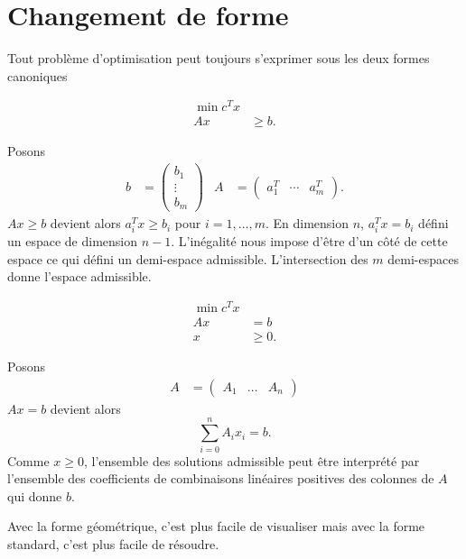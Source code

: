 \section{Changement de forme}
Tout problème d'optimisation peut toujours s'exprimer sous les deux
formes canoniques
\begin{mydef}
  \begin{align*}
    \min c^Tx\\
    Ax & \geq b.
  \end{align*}
\end{mydef}
Posons
\begin{align*}
  b & = \begin{pmatrix}b_1\\\vdots\\b_m\end{pmatrix} &
  A & = \begin{pmatrix}a_1^T & \cdots & a_m^T\end{pmatrix}.
\end{align*}
$Ax \geq b$ devient alors $a_i^Tx \geq b_i$ pour $i = 1, \ldots, m$.
En dimension $n$, $a_i^Tx = b_i$ défini un espace de dimension $n-1$.
L'inégalité nous impose d'être d'un côté de cette espace ce qui défini
un demi-espace admissible.
L'intersection des $m$ demi-espaces donne l'espace admissible.
\begin{mydef}
  \begin{align*}
    \min c^Tx\\
    Ax & = b\\
    x & \geq 0.
  \end{align*}
\end{mydef}
Posons
\begin{align*}
A & = \begin{pmatrix}A_1 & \ldots & A_n\end{pmatrix}
\end{align*}
$Ax = b$ devient alors
\[ \sum_{i=0}^n A_ix_i = b. \]
Comme $x \geq 0$, l'ensemble des solutions admissible peut être interprété
par l'ensemble des coefficients de combinaisons linéaires positives des
colonnes de $A$ qui donne $b$.

Avec la forme géométrique, c'est plus facile de visualiser
mais avec la forme standard, c'est plus facile de résoudre.

